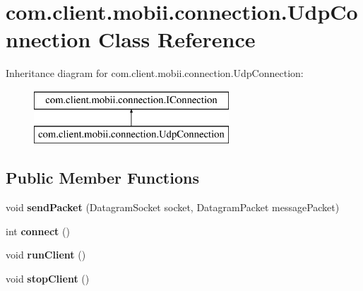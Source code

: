 \hypertarget{classcom_1_1client_1_1mobii_1_1connection_1_1_udp_connection}{\section{com.\-client.\-mobii.\-connection.\-Udp\-Connection Class Reference}
\label{classcom_1_1client_1_1mobii_1_1connection_1_1_udp_connection}
}
Inheritance diagram for com.\-client.\-mobii.\-connection.\-Udp\-Connection\-:\begin{figure}[H]
\begin{center}
\leavevmode
\includegraphics[height=2.000000cm]{classcom_1_1client_1_1mobii_1_1connection_1_1_udp_connection}
\end{center}
\end{figure}
\subsection*{Public Member Functions}
\begin{DoxyCompactItemize}
\item 
\hypertarget{classcom_1_1client_1_1mobii_1_1connection_1_1_udp_connection_aec48b4ad9604f69a36c3aba810988e72}{void {\bfseries send\-Packet} (Datagram\-Socket socket, Datagram\-Packet message\-Packet)}\label{classcom_1_1client_1_1mobii_1_1connection_1_1_udp_connection_aec48b4ad9604f69a36c3aba810988e72}

\item 
\hypertarget{classcom_1_1client_1_1mobii_1_1connection_1_1_udp_connection_a2275371c1d393c8ef20ff7de8f962e31}{int {\bfseries connect} ()}\label{classcom_1_1client_1_1mobii_1_1connection_1_1_udp_connection_a2275371c1d393c8ef20ff7de8f962e31}

\item 
\hypertarget{classcom_1_1client_1_1mobii_1_1connection_1_1_udp_connection_a519573746d41e09e72eef56ad7dd94ac}{void {\bfseries run\-Client} ()}\label{classcom_1_1client_1_1mobii_1_1connection_1_1_udp_connection_a519573746d41e09e72eef56ad7dd94ac}

\item 
\hypertarget{classcom_1_1client_1_1mobii_1_1connection_1_1_udp_connection_ab02fc4dce69fa3232a9413e8a03e0d27}{void {\bfseries stop\-Client} ()}\label{classcom_1_1client_1_1mobii_1_1connection_1_1_udp_connection_ab02fc4dce69fa3232a9413e8a03e0d27}

\end{DoxyCompactItemize}
